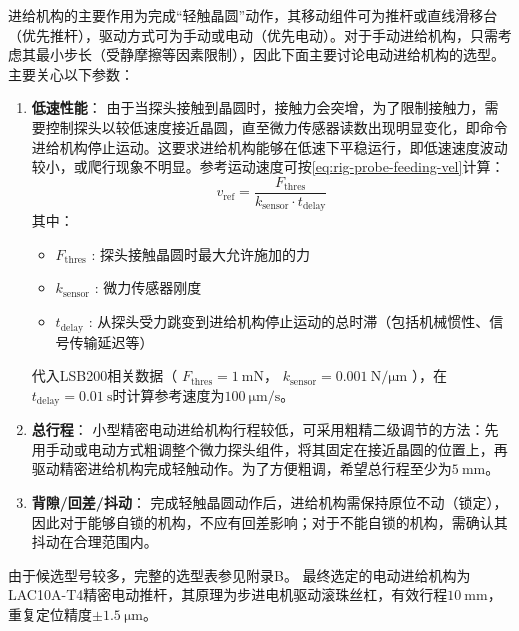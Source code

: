 进给机构的主要作用为完成“轻触晶圆”动作，其移动组件可为推杆或直线滑移台（优先推杆），驱动方式可为手动或电动（优先电动）。对于手动进给机构，只需考虑其最小步长（受静摩擦等因素限制），因此下面主要讨论电动进给机构的选型。主要关心以下参数：

\begin{enumerate}
  \item \textbf{低速性能}：
    由于当探头接触到晶圆时，接触力会突增，为了限制接触力，需要控制探头以较低速度接近晶圆，直至微力传感器读数出现明显变化，即命令进给机构停止运动。这要求进给机构能够在低速下平稳运行，即低速速度波动较小，或爬行现象不明显。参考运动速度可按\eqref{eq:rig-probe-feeding-vel}计算：
    \begin{equation}
    \label{eq:rig-probe-feeding-vel}
    v_{\mathrm{ref}} = \frac{ F_{\mathrm{thres}} }
                            { k_{\mathrm{sensor}} \cdot t_{\mathrm{delay}} }
    \end{equation}
    其中：
    \begin{itemize}
      \item $F_{\mathrm{thres}}$  : 探头接触晶圆时最大允许施加的力
      \item $k_{\mathrm{sensor}}$ : 微力传感器刚度
      \item $t_{\mathrm{delay}}$  :  从探头受力跳变到进给机构停止运动的总时滞（包括机械惯性、信号传输延迟等）
    \end{itemize}
    代入LSB200相关数据（
    $F_{\mathrm{thres}} = \SI{1}{\milli\newton}$，
    $k_{\mathrm{sensor}} = \SI[per-mode=symbol]{0.001}{\newton\per\micro\meter}$
    ），在$t_{\mathrm{delay}} = \SI{0.01}{\second}$时计算参考速度为$\SI[per-mode=symbol]{100}{\micro\meter\per\second}$。
  \item \textbf{总行程}：
    小型精密电动进给机构行程较低，可采用粗精二级调节的方法：先用手动或电动方式粗调整个微力探头组件，将其固定在接近晶圆的位置上，再驱动精密进给机构完成轻触动作。为了方便粗调，希望总行程至少为$\SI{5}{\milli\meter}$。
  \item \textbf{背隙/回差/抖动}：
    完成轻触晶圆动作后，进给机构需保持原位不动（锁定），因此对于能够自锁的机构，不应有回差影响；对于不能自锁的机构，需确认其抖动在合理范围内。
\end{enumerate}

由于候选型号较多，完整的选型表参见附录B。 %
最终选定的电动进给机构为LAC10A-T4精密电动推杆，其原理为步进电机驱动滚珠丝杠，有效行程$\SI{10}{\milli\meter}$，重复定位精度$\pm\SI{1.5}{\micro\meter}$。




